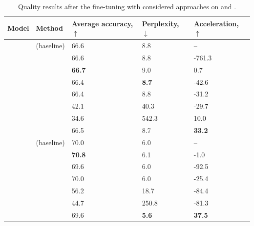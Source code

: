 \begin{table}[!t]
    \caption{Quality results after the fine-tuning with considered approaches on \qwenMedium{} and \qwenLarge{}.}
    \centering  
    \scriptsize
    \begin{tabularx}{0.99\textwidth}{AM|TTT}

        \toprule

        \bfseries Model &
        \bfseries Method & 
        \bfseries Average accuracy, \(\uparrow\) & 
        \bfseries Perplexity, \(\downarrow\) &
        \bfseries Acceleration, \(\uparrow\) \\

        \midrule 
        & \lora{} (baseline) & 66.6 & 8.8 & -- \\
        & \dora{} & 66.6 & 8.8 & -761.3 \\
        & \pissa{} & \bfseries 66.7 & 9.0 & 0.7 \\
        & \adalora{} & 66.4 & \bfseries 8.7 & -42.6 \\
        & \uidl{} & 66.4 & 8.8 & -31.2 \\
        & \sleb{} & 42.1 & 40.3 & -29.7 \\
        & \shortllama{} & 34.6 & 542.3 & 10.0 \\
        &  \ourmethodshort{} &  66.5 &  8.7 &  \bfseries 33.2 \\
        \midrule
        & \lora{} (baseline) & 70.0 & 6.0 & -- \\
        & \pissa{} & \bfseries 70.8 & 6.1 & -1.0 \\
        & \adalora{} & 69.6 & 6.0 & -92.5 \\
        & \uidl{} & 70.0 & 6.0 & -25.4 \\
        & \sleb{} & 56.2 & 18.7 & -84.4 \\
        & \shortllama{} & 44.7 & 250.8 & -81.3 \\
        &  \ourmethodshort{} &  69.6 &  \bfseries 5.6 &  \bfseries 37.5 \\
        \bottomrule
    \end{tabularx}
    \label{tab:quality_2}
\end{table}